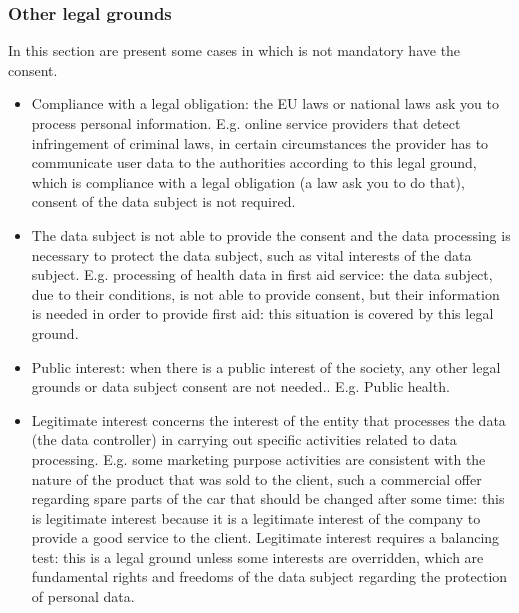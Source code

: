 \subsubsection{Other legal grounds}
In this section are present some cases in which is not mandatory have the consent.
\begin{itemize}
    \item Compliance with a legal obligation: the EU laws or national laws ask you to process personal information. E.g. online service providers that detect infringement of criminal laws, in certain circumstances the provider has to communicate user data to the authorities according to this legal ground, which is compliance with a legal obligation (a law ask you to do that), consent of the data subject is not required.
    \item The data subject is not able to provide the consent and the data processing is necessary to protect the data subject, such as vital interests of the data subject. E.g. processing of health data in first aid service: the data subject, due to their conditions, is not able to provide consent, but their information is needed in order to provide first aid: this situation is covered by this legal ground.
    \item Public interest: when there is a public interest of the society, any other legal grounds or data subject consent are not needed.. E.g. Public health.
    \item Legitimate interest concerns the interest of the entity that processes the data (the data controller) in carrying out specific activities related to data processing.  E.g. some marketing purpose activities are consistent with the nature of the product that was sold to the client, such a commercial offer regarding spare parts of the car that should be changed after some time: this is legitimate interest because it is a legitimate interest of the company to provide a good service to the client. Legitimate interest requires a balancing test: this is a legal ground unless some interests are overridden, which are fundamental rights and freedoms of the data subject regarding the protection of personal data.
\end{itemize}


